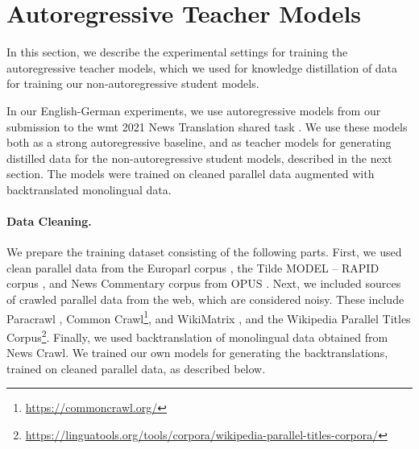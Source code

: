 \section{Autoregressive Teacher Models}%
\label{sec:exp:teachers}


\noindent
In this section, we describe the experimental settings for training the
autoregressive teacher models, which we used for knowledge distillation of data
for training our non-autoregressive student models.

In our English-German experiments, we use autoregressive models from our
submission to the \ac{wmt} 2021 News Translation shared task
\citep{chen-etal-2021-university}. We use these models both as a strong
autoregressive baseline, and as teacher models for generating distilled data
for the non-autoregressive student models, described in the next section.  The
models were trained on cleaned parallel data augmented with backtranslated
monolingual data.

\paragraph{Data Cleaning.} We prepare the training dataset consisting of the
following parts. First, we used clean parallel data from the Europarl corpus
\citep{koehn-2005-europarl}, the Tilde MODEL -- RAPID corpus
\citep{rozis-skadins-2017-tilde}, and News Commentary corpus from OPUS
\citep{tiedemann-2012-parallel}. Next, we included sources of crawled parallel
data from the web, which are considered noisy. These include Paracrawl
\citep{espla-etal-2019-paracrawl}, Common
Crawl\footnote{\url{https://commoncrawl.org/}}, and WikiMatrix
\citep{schwenk2019wikimatrix}, and the Wikipedia Parallel Titles
Corpus\footnote{\url{https://linguatools.org/tools/corpora/wikipedia-parallel-titles-corpora/}}. Finally,
we used backtranslation \citep{sennrich-etal-2016-improving} of monolingual
data obtained from News Crawl. We trained our own models for generating the
backtranslations, trained on cleaned parallel data, as described below.

